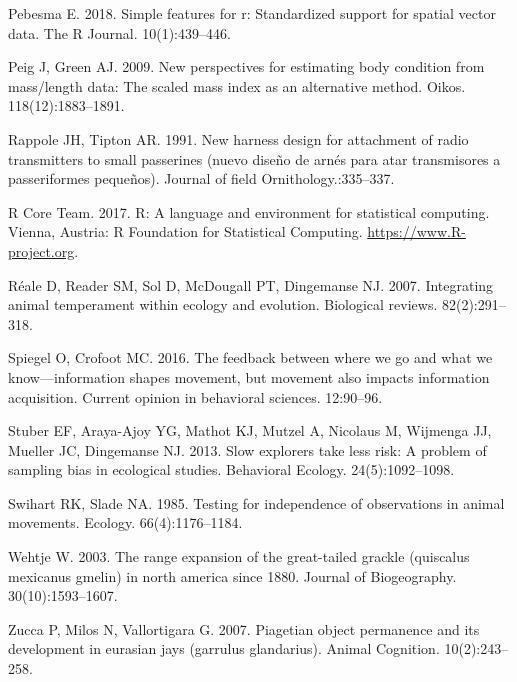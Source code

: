 \documentclass[
]{article}
\begin{document}
\leavevmode\hypertarget{ref-pebesma2018simple}{}%
Pebesma E. 2018. Simple features for r: Standardized support for spatial
vector data. The R Journal. 10(1):439--446.

\leavevmode\hypertarget{ref-peig2009new}{}%
Peig J, Green AJ. 2009. New perspectives for estimating body condition
from mass/length data: The scaled mass index as an alternative method.
Oikos. 118(12):1883--1891.

\leavevmode\hypertarget{ref-rappole1991new}{}%
Rappole JH, Tipton AR. 1991. New harness design for attachment of radio
transmitters to small passerines (nuevo diseño de arnés para atar
transmisores a passeriformes pequeños). Journal of field
Ornithology.:335--337.

\leavevmode\hypertarget{ref-rcoreteam}{}%
R Core Team. 2017. R: A language and environment for statistical
computing. Vienna, Austria: R Foundation for Statistical Computing.
\url{https://www.R-project.org}.

\leavevmode\hypertarget{ref-reale2007integrating}{}%
Réale D, Reader SM, Sol D, McDougall PT, Dingemanse NJ. 2007.
Integrating animal temperament within ecology and evolution. Biological
reviews. 82(2):291--318.

\leavevmode\hypertarget{ref-spiegel2016feedback}{}%
Spiegel O, Crofoot MC. 2016. The feedback between where we go and what
we know---information shapes movement, but movement also impacts
information acquisition. Current opinion in behavioral sciences.
12:90--96.

\leavevmode\hypertarget{ref-stuber2013slow}{}%
Stuber EF, Araya-Ajoy YG, Mathot KJ, Mutzel A, Nicolaus M, Wijmenga JJ,
Mueller JC, Dingemanse NJ. 2013. Slow explorers take less risk: A
problem of sampling bias in ecological studies. Behavioral Ecology.
24(5):1092--1098.

\leavevmode\hypertarget{ref-swihart1985testing}{}%
Swihart RK, Slade NA. 1985. Testing for independence of observations in
animal movements. Ecology. 66(4):1176--1184.

\leavevmode\hypertarget{ref-wehtje2003range}{}%
Wehtje W. 2003. The range expansion of the great-tailed grackle
(quiscalus mexicanus gmelin) in north america since 1880. Journal of
Biogeography. 30(10):1593--1607.

\leavevmode\hypertarget{ref-zucca2007piagetian}{}%
Zucca P, Milos N, Vallortigara G. 2007. Piagetian object permanence and
its development in eurasian jays (garrulus glandarius). Animal
Cognition. 10(2):243--258.
\end{document}
